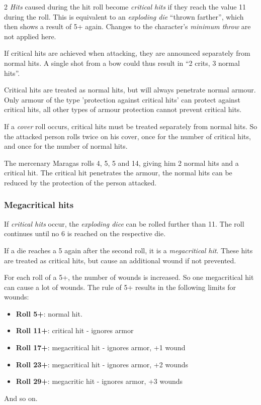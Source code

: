 \begin{multicols}{2}
\textit{Hits} caused during the hit roll become \textit{critical hits} if they reach the value 11 during the roll. This is equivalent to an \textit{exploding die} ``thrown farther'', which then shows a result of 5+ again. Changes to the character's \textit{minimum throw} are not applied here.


If critical hits are achieved when attacking, they are announced separately from normal hits. A single shot from a bow could thus result in ``2 crits, 3 normal hits''.

Critical hits are treated as normal hits, but will always penetrate normal armour. Only armour of the type 'protection against critical hits' can protect against critical hits, all other types of armour protection cannot prevent critical hits.

If a \textit{cover} roll occurs, critical hits must be treated separately from normal hits. So the attacked person rolls twice on his cover, once for the number of critical hits, and once for the number of normal hits.

\begin{pexample}[Example]
The mercenary Maragas rolls 4, 5, 5 and 14, giving him 2 normal hits and a critical hit. The critical hit penetrates the armour, the normal hits can be reduced by the protection of the person attacked.
\end{pexample}

\subsubsection{Megacritical hits}

If \textit{critical hits} occur, the \textit{exploding dice} can be rolled further than 11. The roll continues until no 6 is reached on the respective die.

If a die reaches a 5 again after the second roll, it is a \textit{megacritical hit}. These hits are treated as critical hits, but cause an additional wound if not prevented.

For each roll of a 5+, the number of wounds is increased. So one megacritical hit can cause a lot of wounds. The rule of 5+ results in the following limits for wounds:
\begin{itemize}
    \item \textbf{Roll 5+}: normal hit.
    \item \textbf{Roll 11+}: critical hit - ignores armor
    \item \textbf{Roll 17+}: megacritical hit - ignores armor, +1 wound
    \item \textbf{Roll 23+}: megacritical hit - ignores armor, +2 wounds
    \item \textbf{Roll 29+}: megacritic hit - ignores armor, +3 wounds
\end{itemize}
And so on.


\end{multicols}
